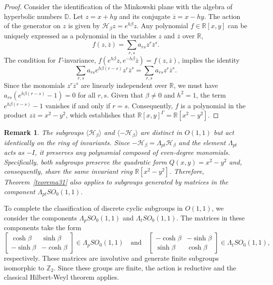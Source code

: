 \documentclass[]{article}
\newtheorem{remark}[theorem]{Remark}
\begin{document}
\begin{proof}
	Consider the identification of the Minkowski plane with the algebra of hyperbolic numbers $\mathbb{D}$. Let $z = x+hy$ and its conjugate $\overline{z} = x-hy$. The action of the generator on $z$ is given by $\mathcal{H}_\beta z = e^{h\beta} z$. Any polynomial $f \in \mathbb{R}[x,y]$ can be uniquely expressed as a polynomial in the variables $z$ and $\overline{z}$ over $\mathbb{R}$,
	$$ f(z, \overline{z}) = \sum_{r,s} a_{rs} z^r \overline{z}^s. $$
	The condition for $\Gamma$-invariance, $f(e^{h\beta} z, e^{-h\beta} \overline{z}) = f(z, \overline{z})$, implies the identity
	$$ \sum_{r,s} a_{rs} e^{h\beta(r-s)} z^r \overline{z}^s = \sum_{r,s} a_{rs} z^r \overline{z}^s. $$
	Since the monomials $z^r \overline{z}^s$ are linearly independent over $\mathbb{R}$, we must have $a_{rs} (e^{h\beta(r-s)} - 1) = 0$ for all $r, s$. Given that $\beta \neq 0$ and $h^2=1$, the term $e^{h\beta(r-s)} - 1$ vanishes if and only if $r = s$. Consequently, $f$ is a polynomial in the product $z\overline{z} = x^2 - y^2$, which establishes that $\mathbb{R}[x,y]^\Gamma = \mathbb{R}[x^2 - y^2]$.
\end{proof}

\begin{remark}
	The subgroups $\langle \mathcal{H}_\beta \rangle$ and $\langle -\mathcal{H}_\beta \rangle$ are distinct in $O(1,1)$ but act identically on the ring of invariants. Since $-\mathcal{H}_\beta = \Lambda_{pt} \mathcal{H}_\beta$ and the element $\Lambda_{pt}$ acts as $-I$, it preserves any polynomial composed of even-degree monomials. Specifically, both subgroups preserve the quadratic form $Q(x,y) = x^2 - y^2$ and, consequently, share the same invariant ring $\mathbb{R}[x^2 - y^2]$. Therefore, Theorem~\ref{teorema31} also applies to subgroups generated by matrices in the component $\Lambda_{pt} SO_0(1,1)$.
\end{remark}

To complete the classification of discrete cyclic subgroups in $O(1,1)$, we consider the components $\Lambda_p SO_0(1,1)$ and $\Lambda_t SO_0(1,1)$. The matrices in these components take the form
$$\begin{bmatrix}
	\cosh \beta & \sinh \beta \\
	-\sinh \beta & -\cosh \beta
\end{bmatrix} \in \Lambda_p SO_0(1,1) \quad \text{and} \quad
\begin{bmatrix}
	-\cosh \beta & -\sinh \beta \\
	\sinh \beta & \cosh \beta
\end{bmatrix} \in \Lambda_t SO_0(1,1),$$
respectively. These matrices are involutive and generate finite subgroups isomorphic to $\mathbb{Z}_2$. Since these groups are finite, the action is reductive and the classical Hilbert-Weyl theorem applies.
\end{document}
